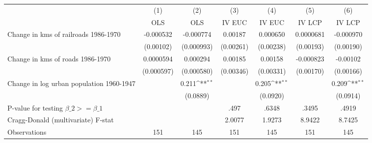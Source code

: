 {
\def\sym#1{\ifmmode^{#1}\else\(^{#1}\)\fi}
\begin{tabular}{l*{6}{c}}
\hline\hline
                &\multicolumn{1}{c}{(1)}&\multicolumn{1}{c}{(2)}&\multicolumn{1}{c}{(3)}&\multicolumn{1}{c}{(4)}&\multicolumn{1}{c}{(5)}&\multicolumn{1}{c}{(6)}\\
                &\multicolumn{1}{c}{OLS}&\multicolumn{1}{c}{OLS}&\multicolumn{1}{c}{IV EUC}&\multicolumn{1}{c}{IV EUC}&\multicolumn{1}{c}{IV LCP}&\multicolumn{1}{c}{IV LCP}\\
\hline
Change in kms of railroads 1986-1970&-0.000532         &-0.000774         &  0.00187         & 0.000650         &0.0000681         &-0.000970         \\
                &(0.00102)         &(0.000993)         &(0.00261)         &(0.00238)         &(0.00193)         &(0.00190)         \\
[1em]
Change in kms of roads 1986-1970&0.0000594         & 0.000294         &  0.00185         &  0.00158         &-0.000823         & -0.00102         \\
                &(0.000597)         &(0.000580)         &(0.00346)         &(0.00331)         &(0.00170)         &(0.00166)         \\
[1em]
Change in log urban population 1960-1947&                  &    0.211\sym{**} &                  &    0.205\sym{**} &                  &    0.209\sym{**} \\
                &                  & (0.0889)         &                  & (0.0920)         &                  & (0.0914)         \\
\hline
P-value for testing $\beta\_{2} >= \beta\_{1}$&                  &                  &     .497         &    .6348         &    .3495         &    .4919         \\
Cragg-Donald (multivariate) F-stat&                  &                  &   2.0077         &   1.9273         &   8.9422         &   8.7425         \\
Observations    &      151         &      145         &      151         &      145         &      151         &      145         \\
\hline\hline
\end{tabular}
}
